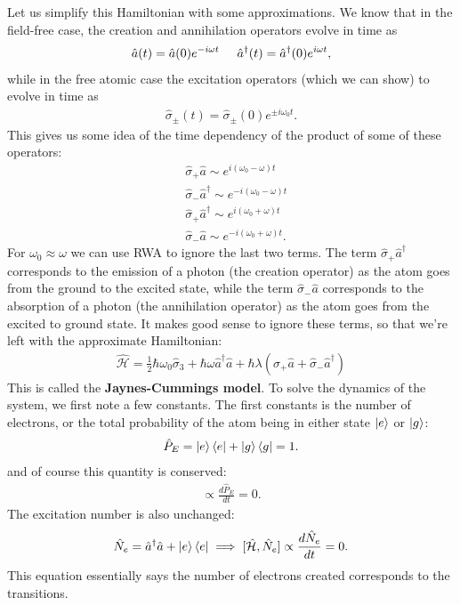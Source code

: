 \documentclass{book}
\theoremstyle{definition}
\newcommand{\ham}{\mathcal{H}}
\newcommand{\f}[2]{\frac{#1}{#2}}
\newcommand{\lp}{\left(}
\newcommand{\rp}{\right)}
\begin{document}
Let us simplify this Hamiltonian with some approximations. We know that in the field-free case, the creation and annihilation operators evolve in time as
\begin{align}
\hat{a}(t) = \hat{a}(0)e^{-i\omega t} \hspace{0.5cm} \hat{a}^\dagger(t) = \hat{a}^\dagger(0)e^{i\omega t},
\end{align}
while in the free atomic case the excitation operators (which we can show) to evolve in time as
\begin{align}
\hat{\sigma}_{\pm}(t) = \hat{\sigma}_\pm(0)e^{\pm i \omega_0 t}.
\end{align}
This gives us some idea of the time dependency of the product of some of these operators:
\begin{align}
&\hat{\sigma}_+ \hat{a} \sim e^{i(\omega_0 - \omega)t}\\
&\hat{\sigma}_- \hat{a}^\dagger \sim e^{-i(\omega_0 - \omega)t}\\
&\hat{\sigma}_+ \hat{a}^\dagger \sim e^{i(\omega_0 + \omega)t}\\
&\hat{\sigma}_- \hat{a} \sim e^{-i(\omega_0 + \omega)t}.
\end{align}
For $\omega_0 \approx \omega$ we can use RWA to ignore the last two terms. The term $\hat{\sigma}_+ \hat{a}^\dagger$ corresponds to the emission of a photon (the creation operator) as the atom goes from the ground to the excited state, while the term $\hat{\sigma}_- \hat{a}$ corresponds to the absorption of a photon (the annihilation operator) as the atom goes from the excited to ground state. It makes good sense to ignore these terms, so that we're left with the approximate Hamiltonian:
\begin{align}
\boxed{\hat{\ham} = \f{1}{2}\hbar\omega_0 \hat{\sigma}_3  + \hbar\omega\hat{a}^\dagger\hat{a} + \hbar \lambda\lp  \hat{\sigma}_+ \hat{a}  + \hat{\sigma}_-\hat{a}^\dagger \rp}
\end{align}
This is called the \textbf{Jaynes-Cummings model}. To solve the dynamics of the system, we first note a few constants. The first constants is the number of electrons, or the total probability of the atom being in either state $\ket{e}$ or $\ket{g}$:
\begin{align}
\hat{P}_E = \ket{e}\bra{e} + \ket{g}\bra{g} = 1.
\end{align}
and of course this quantity is conserved: 
\begin{align}
[\hat{\ham}, \hat{P}_E] \propto \f{d\hat{P}_E}{d t} = 0.
\end{align}
The excitation number is also unchanged: 
\begin{align}
\hat{N}_e = \hat{a}^\dagger\hat{a} + \ket{e}\bra{e} \implies [\hat{\ham}, \hat{N}_e] \propto \f{d\hat{N}_e}{dt} = 0.
\end{align}
This equation essentially says the number of electrons created corresponds to the transitions.\\
\end{document}
